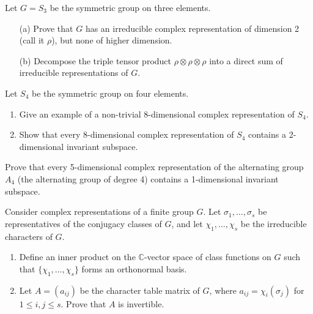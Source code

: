 \begin{prob}[F2014-Q3]
    Let \( G = S_3 \) be the symmetric group on three elements.

\begin{enumerate}
    \item[(a)] Prove that \( G \) has an irreducible complex representation of dimension 2 (call it \( \rho \)), but none of higher dimension.
    
    \item[(b)] Decompose the triple tensor product \( \rho \otimes \rho \otimes \rho \) into a direct sum of irreducible representations of \( G \).
\end{enumerate}
\end{prob}

\begin{prob}[S2006-Q6]
    Let \( S_4 \) be the symmetric group on four elements.
    
    \begin{enumerate}
        \item Give an example of a non-trivial 8-dimensional complex representation of \( S_4 \).
        
        \item Show that every 8-dimensional complex representation of \( S_4 \) contains a 2-dimensional invariant subspace.
    \end{enumerate}
\end{prob}

\begin{prob}[F2007-Q5]
    Prove that every 5-dimensional complex representation of the alternating group \( A_4 \) (the alternating group of degree 4) contains a 1-dimensional invariant subspace.
\end{prob}

\begin{prob}[S2004-Q6]
    Consider complex representations of a finite group \( G \). Let \( \sigma_1, \ldots, \sigma_s \) be representatives of the conjugacy classes of \( G \), and let \( \chi_1, \ldots, \chi_s \) be the irreducible characters of \( G \).
    
    \begin{enumerate}
        \item Define an inner product on the \(\mathbb{C}\)-vector space of class functions on \( G \) such that \( \{\chi_1, \ldots, \chi_s\} \) forms an orthonormal basis.
        
        \item Let \( A = (a_{ij}) \) be the character table matrix of \( G \), where \( a_{ij} = \chi_i(\sigma_j) \) for \( 1 \leq i, j \leq s \). Prove that \( A \) is invertible.
    \end{enumerate}
\end{prob}

